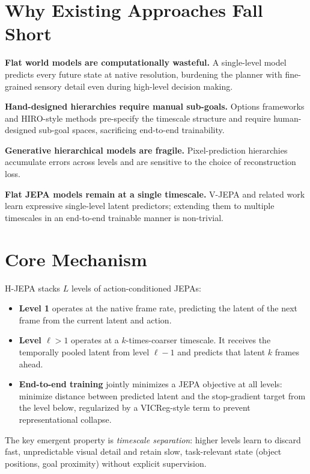 \documentclass[10pt,twocolumn]{article}
\begin{document}
\section{Why Existing Approaches Fall Short}

\textbf{Flat world models are computationally wasteful.} A single-level model
predicts every future state at native resolution, burdening the planner with
fine-grained sensory detail even during high-level decision making.

\textbf{Hand-designed hierarchies require manual sub-goals.} Options
frameworks and HIRO-style methods pre-specify the timescale structure and
require human-designed sub-goal spaces, sacrificing end-to-end trainability.

\textbf{Generative hierarchical models are fragile.} Pixel-prediction
hierarchies accumulate errors across levels and are sensitive to the choice
of reconstruction loss.

\textbf{Flat JEPA models remain at a single timescale.} V-JEPA and related
work learn expressive single-level latent predictors; extending them to
multiple timescales in an end-to-end trainable manner is non-trivial.

\section{Core Mechanism}

H-JEPA stacks $L$ levels of action-conditioned JEPAs:

\begin{itemize}[itemsep=2pt,parsep=0pt]
  \item \textbf{Level 1} operates at the native frame rate, predicting the
    latent of the next frame from the current latent and action.
  \item \textbf{Level $\ell > 1$} operates at a $k$-times-coarser timescale.
    It receives the temporally pooled latent from level $\ell{-}1$ and
    predicts that latent $k$ frames ahead.
  \item \textbf{End-to-end training} jointly minimizes a JEPA objective at
    all levels: minimize distance between predicted latent and the
    stop-gradient target from the level below, regularized by a VICReg-style
    term to prevent representational collapse.
\end{itemize}

The key emergent property is \emph{timescale separation}: higher levels learn
to discard fast, unpredictable visual detail and retain slow, task-relevant
state (object positions, goal proximity) without explicit supervision.
\end{document}
